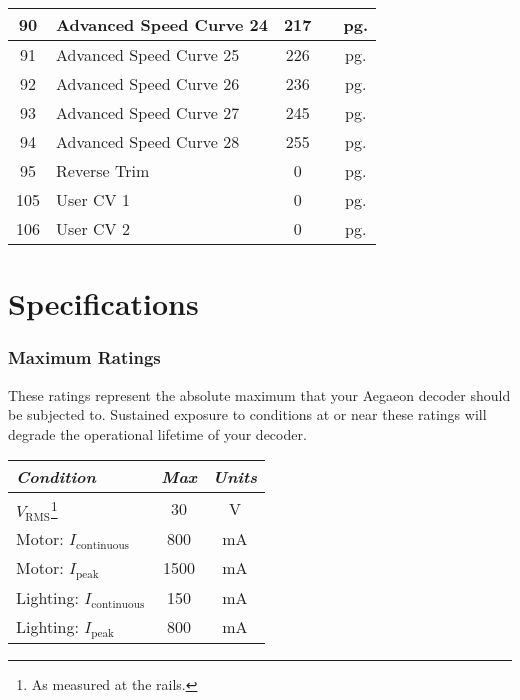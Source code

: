 \documentclass[12pt,letterpaper,draft]{memoir} %
\begin{document}
\begin{center}
\begin{longtable}{|c|l|c|c|c|}
90&Advanced Speed Curve 24&217&&pg. \pageref{CV90} \\ \hline
91&Advanced Speed Curve 25&226&&pg. \pageref{CV91} \\ \hline
92&Advanced Speed Curve 26&236&&pg. \pageref{CV92} \\ \hline
93&Advanced Speed Curve 27&245&&pg. \pageref{CV93} \\ \hline
94&Advanced Speed Curve 28&255&&pg. \pageref{CV94} \\ \hline
95&Reverse Trim&0&&pg. \pageref{CV95} \\ \hline
105&User CV 1&0&&pg. \pageref{CV105} \\ \hline
106&User CV 2&0&&pg. \pageref{CV106} \\ \hline
\end{longtable}
\end{center}

\chapter{Specifications}

\subsection*{Maximum Ratings}

These ratings represent the absolute maximum that your Aegaeon decoder should be subjected to. Sustained exposure to conditions at or near these ratings will degrade the operational lifetime of your decoder.

\begin{center}
\begin{longtable}{|l|c|c|}
\hline
\textit{Condition} & \textit{Max} & \textit{Units}\\ \hline
$V_{\mathrm{RMS}}$\footnote{As measured at the rails.} & 30 & V \\ \hline
Motor: $I_{\mathrm{continuous}}$ & 800 & mA \\ \hline
Motor: $I_{\mathrm{peak}}$ & 1500 & mA \\ \hline
Lighting: $I_{\mathrm{continuous}}$ & 150 & mA \\ \hline
Lighting: $I_{\mathrm{peak}} $ & 800 & mA \\ \hline
\end{longtable}
\end{center}
\end{document}
